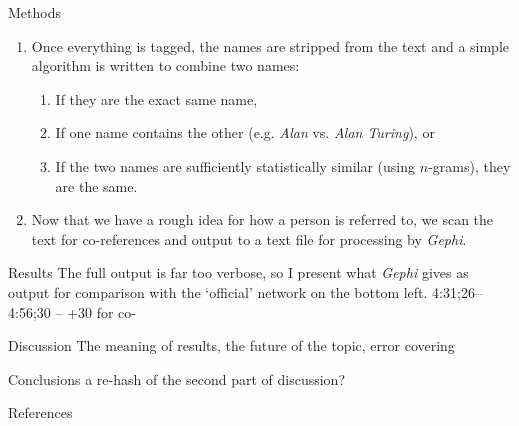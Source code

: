 \documentclass{beamer}
\newcommand{\Gephi}{\textit{Gephi}\xspace}
\begin{document}
\begin{frame}[t,fragile]{}
\begin{columns}
\begin{column}{.45\textwidth}
\begin{block}{Methods}
\begin{enumerate}
        \item Once everything is tagged, the names are stripped from
          the text and a simple algorithm is written to combine two
          names:
          \begin{enumerate}
          \item If they are the exact same name,
          \item If one name contains the other (e.g. \textsl{Alan}
            vs. \textsl{Alan Turing}), or
          \item If the two names are sufficiently statistically
            similar (using $n$-grams), they are the same.
          \end{enumerate}
        \item Now that we have a rough idea for how a person is
          referred to, we scan the text for co-references and output
          to a text file for processing by \Gephi.
        \end{enumerate}
      \end{block}

      \begin{block}{Results}
        The full output is far too verbose, so I present what \Gephi
        gives as output for comparison with the `official' network on
        the bottom left. 4:31;26--4:56;30 -- +30 for co-
      \end{block}

      \begin{block}{Discussion} 
        The meaning of results, the future of the topic, error covering
      \end{block}

      \begin{block}{Conclusions}
        a re-hash of the second part of discussion?
      \end{block}

      \begin{block}{References}
        \centering
        \begin{minipage}{.9\linewidth}
          \printbibliography
        \end{minipage}
      \end{block}
    \end{column}
  \end{columns}
\end{frame}
\end{document}
